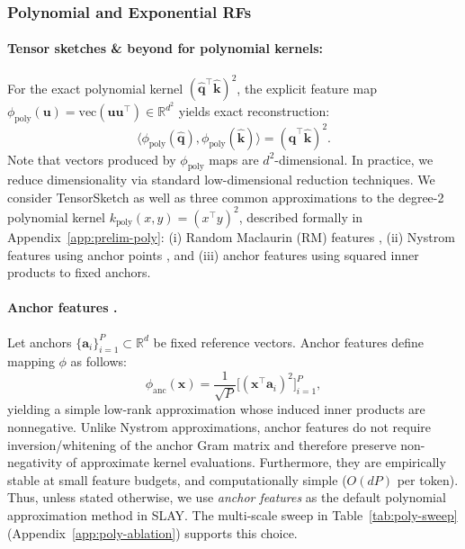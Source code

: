 \documentclass{article}
\newcommand{\R}{\mathbb{R}}
\begin{document}
\subsubsection{Polynomial and Exponential RFs}
\label{sec:poly-exp-rfs}

\paragraph{Tensor sketches \& beyond for polynomial kernels:}
For the exact polynomial kernel $(\widehat{\mathbf{q}}^\top \widehat{\mathbf{k}})^2$, the explicit feature map $\phi_{\text{poly}}(\mathbf{u}) = \mathrm{vec}(\mathbf{u} \mathbf{u}^\top) \in \R^{d^2}$ yields exact reconstruction:
\[
\langle \phi_{\text{poly}}(\widehat{\mathbf{q}}), \phi_{\text{poly}}(\widehat{\mathbf{k}}) \rangle = (\widehat{\mathbf{q}}^\top \widehat{\mathbf{k}})^2.
\]
Note that vectors produced by $\phi_{\mathrm{poly}}$ maps are $d^{2}$-dimensional. In practice, we reduce dimensionality via standard low-dimensional reduction techniques. We consider TensorSketch \citep{pham2013} as well as three common approximations to the degree-2 polynomial kernel $k_{\text{poly}}(x,y)=(x^\top y)^2$, described formally in Appendix~\ref{app:prelim-poly}: (i) Random Maclaurin (RM) features \citep{karkarnick2012}, (ii) Nystrom features using anchor points \citep{williams2001nystrom}, and (iii) anchor features using squared inner products to fixed anchors.

\paragraph{Anchor features \citep{scholkopf2002learning}.}
Let anchors $\{\mathbf{a}_i\}_{i=1}^P\subset\R^d$ be fixed reference vectors. Anchor features define mapping $\phi$ as follows:
\[
\phi_{\mathrm{anc}}(\mathbf{x}) = \frac{1}{\sqrt{P}}\bigl[(\mathbf{x}^\top \mathbf{a}_i)^2\bigr]_{i=1}^P,
\]
yielding a simple low-rank approximation whose induced inner products are nonnegative. Unlike Nystrom approximations, anchor features do not require inversion/whitening of the anchor Gram matrix and therefore preserve non-negativity of approximate kernel evaluations. Furthermore, they are empirically stable at small feature budgets, and computationally simple ($O(dP)$ per token). Thus, unless stated otherwise, we use \emph{anchor features} as the default polynomial approximation method in SLAY. The multi-scale sweep in Table~\ref{tab:poly-sweep} (Appendix~\ref{app:poly-ablation}) supports this choice.
\end{document}
